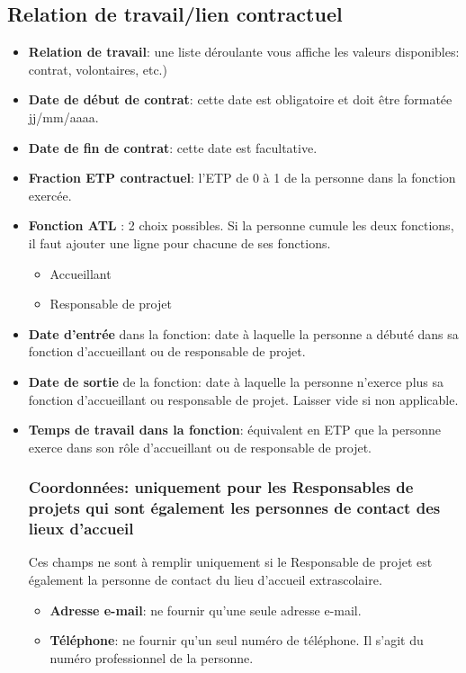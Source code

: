 \subsection{Relation de travail/lien contractuel}
\begin{itemize}
    \item \textbf{Relation de travail}: une liste déroulante vous affiche les valeurs disponibles: contrat, volontaires, etc.)
    \item \textbf{Date de début de contrat}: cette date est obligatoire et doit être formatée jj/mm/aaaa. 
    \item \textbf{Date de fin de contrat}: cette date est facultative.
    \item \textbf{Fraction ETP contractuel}: l'ETP de 0 à 1 de la personne dans la fonction exercée. 
    \item \textbf{Fonction ATL} : 2 choix possibles. Si la personne cumule les deux fonctions, il faut ajouter une ligne pour chacune de ses fonctions. 
        \begin{itemize}[label=\textbullet]
            \item Accueillant
            \item Responsable de projet
        \end{itemize}
    \item \textbf{Date d’entrée} dans la fonction: date à laquelle la personne a débuté dans sa fonction d'accueillant ou de responsable de projet. 
    \item \textbf{Date de sortie} de la fonction: date à laquelle la personne n'exerce plus sa fonction d'accueillant ou responsable de projet. Laisser vide si non applicable. 
    \item \textbf{Temps de travail dans la fonction}: équivalent en ETP que la personne exerce dans son rôle d'accueillant ou de responsable de projet.
    
\subsubsection{Coordonnées: uniquement pour les Responsables de projets qui sont également les personnes de contact des lieux d'accueil} 
Ces champs ne sont à remplir uniquement si le Responsable de projet est également la personne de contact du lieu d'accueil extrascolaire. 
\begin{itemize}
    \item \textbf{Adresse e-mail}: ne fournir qu'une seule adresse e-mail. 
    \item \textbf{Téléphone}: ne fournir qu'un seul numéro de téléphone. Il s'agit du numéro professionnel de la personne.
\end{itemize}
\end{itemize}

